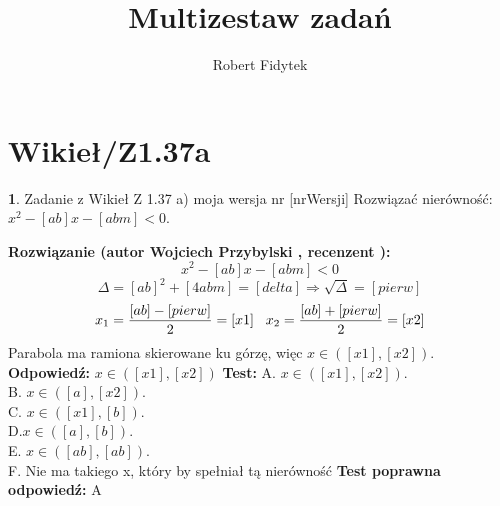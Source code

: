 \documentclass[12pt, a4paper]{article}
\title{Multizestaw zadań}
\author{Robert Fidytek}
\date{}
\theoremstyle{definition} %
\newtheorem{zad}{}
\newcommand{\kategoria}[1]{\section{#1}} %
\newcommand{\zadStart}[1]{\begin{zad}#1\newline} %
\newcommand{\zadStop}{\end{zad}}   %
\newcommand{\rozwStart}[2]{\noindent \textbf{Rozwiązanie (autor #1 , recenzent #2): }\newline} %
\newcommand{\rozwStop}{\newline}                                            %
\newcommand{\odpStart}{\noindent \textbf{Odpowiedź:}\newline}    %
\newcommand{\odpStop}{\newline}                                             %
\newcommand{\testStart}{\noindent \textbf{Test:}\newline} %
\newcommand{\testStop}{\newline} %
\newcommand{\kluczStart}{\noindent \textbf{Test poprawna odpowiedź:}\newline} %
\newcommand{\kluczStop}{\newline} %
\begin{document}
\maketitle


\kategoria{Wikieł/Z1.37a}
\zadStart{Zadanie z Wikieł Z 1.37 a) moja wersja nr [nrWersji]}
Rozwiązać nierówność: $x^{2}-[ab]x-[abm]<0$.
\zadStop
\rozwStart{Wojciech Przybylski}{}
$$x^{2}-[ab]x-[abm]<0$$
$$\Delta=[ab]^{2}+[4abm]=[delta] \Rightarrow \sqrt{\Delta}=[pierw]$$
$$x_{1}=\frac{[ab]-[pierw]}{2}=[x1] \hspace{3mm} x_{2}=\frac{[ab]+[pierw]}{2}=[x2]$$
Parabola ma ramiona skierowane ku górzę, więc $x \in ([x1],[x2])$.
\rozwStop
\odpStart
$x \in ([x1],[x2])$
\odpStop
\testStart
A. $x \in ([x1],[x2])$.\\
B. $x \in ([a],[x2])$.\\
C. $x \in ([x1],[b])$.\\
D.$x \in ([a],[b])$.\\
E. $x \in ([ab],[ab])$.\\
F. Nie ma takiego x, który by spełniał tą nierówność
\testStop
\kluczStart
A
\kluczStop
\end{document}

